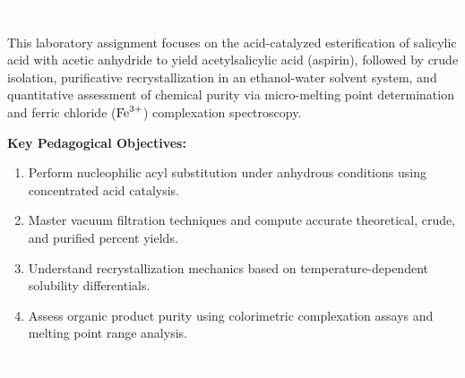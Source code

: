 \documentclass[10pt,a4paper]{article}
\newcommand{\labsection}[2]{%
  \vspace{0.25cm}%
  \begin{tcolorbox}[
    enhanced,
    colback=NavyDark,
    colframe=NavyDark,
    arc=3pt,
    boxrule=0pt,
    left=8pt, right=8pt, top=3pt, bottom=3pt
  ]
    \textcolor{white}{\bfseries\small #1 \quad #2}
  \end{tcolorbox}%
  \vspace{0.05cm}%
}
\begin{document}
\labsection{1}{Executive Summary \& Learning Objectives}

\begin{tcolorbox}[
  enhanced,
  colback=white,
  colframe=BorderGray,
  boxrule=0.5pt,
  arc=3pt,
  left=8pt, right=8pt, top=5pt, bottom=5pt
]
\small
This laboratory assignment focuses on the acid-catalyzed esterification of salicylic acid with acetic anhydride to yield acetylsalicylic acid (aspirin), followed by crude isolation, purificative recrystallization in an ethanol-water solvent system, and quantitative assessment of chemical purity via micro-melting point determination and ferric chloride ($\ce{Fe^{3+}}$) complexation spectroscopy.

\vspace{4pt}
\textbf{Key Pedagogical Objectives:}
\begin{enumerate}[label=\textbf{\arabic*.}, leftmargin=1.5em, itemsep=1pt, topsep=2pt]
  \item Perform nucleophilic acyl substitution under anhydrous conditions using concentrated acid catalysis.
  \item Master vacuum filtration techniques and compute accurate theoretical, crude, and purified percent yields.
  \item Understand recrystallization mechanics based on temperature-dependent solubility differentials.
  \item Assess organic product purity using colorimetric complexation assays and melting point range analysis.
\end{enumerate}
\end{tcolorbox}

\labsection{2}{Chemical Hazards \& Laboratory Safety Protocols}
\end{document}
